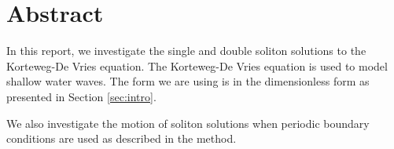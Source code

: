 \section*{Abstract}\label{sec:abstract}

\tbd

In this report, we investigate the single and double soliton solutions to the Korteweg-De Vries equation. The Korteweg-De Vries equation is used to model shallow water waves. The form we are using is in the dimensionless form as presented in Section \ref{sec:intro}.

We also investigate the motion of soliton solutions when periodic boundary conditions are used as described in the method.


